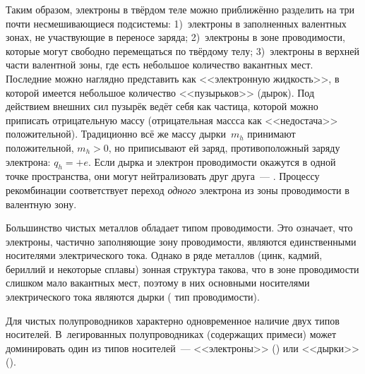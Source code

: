 Таким образом, электроны в твёрдом теле можно приближённо разделить на три
почти несмешивающиеся подсистемы: 1)~электроны в заполненных валентных
зонах, не участвующие в переносе заряда; 2)~электроны в зоне проводимости,
которые могут свободно перемещаться по твёрдому телу;
3)~электроны в верхней части валентной
зоны, где есть небольшое количество вакантных мест.
Последние можно наглядно представить как <<электронную жидкость>>, в которой имеется
небольшое количество <<пузырьков>> (дырок). Под действием внешних сил
пузырёк ведёт себя как частица, которой можно приписать отрицательную массу
(отрицательная массса как <<недостача>> положительной). Традиционно всё же
массу дырки~$m_h$ принимают положительной, $m_h>0$, но приписывают ей
заряд, противоположный заряду электрона: $q_h=+e$.
Если дырка и электрон проводимости окажутся в одной точке пространства,
они могут нейтрализовать друг друга~---
. Процессу рекомбинации соответствует 
переход \emph{одного} электрона из зоны проводимости в валентную зону.

Большинство чистых металлов обладает  типом проводимости.
Это означает, что электроны, частично заполняющие зону проводимости,
являются единственными носителями электрического тока.
Однако в ряде металлов (цинк, кадмий, бериллий и некоторые сплавы) зонная структура
такова, что в зоне проводимости слишком мало вакантных мест, поэтому
в них основными носителями электрического тока являются
дырки ( тип проводимости).

Для чистых полупроводников характерно одновременное наличие двух типов носителей.
В~легированных полупроводниках (содержащих примеси) может доминировать один из
типов носителей~--- <<электроны>> () или 
<<дырки>> ().



\label{sec:ohm}

